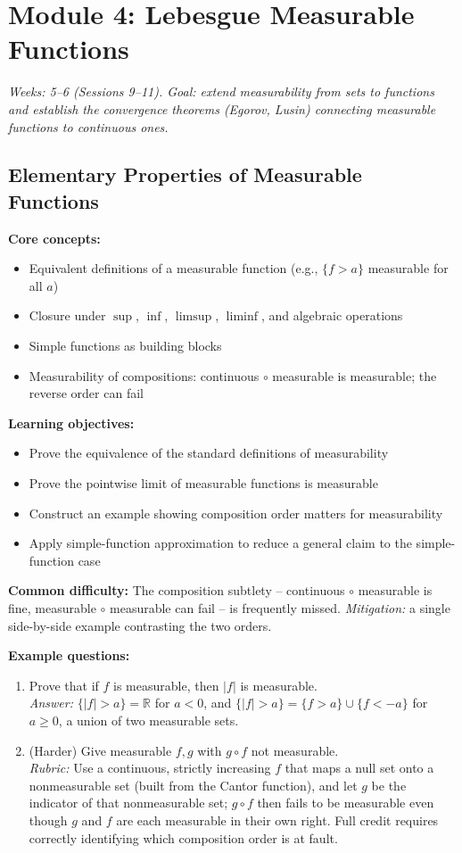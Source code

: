 \documentclass[11pt]{article}
\begin{document}
\section{Module 4: Lebesgue Measurable Functions}
\textit{Weeks: 5--6 (Sessions 9--11). Goal: extend measurability from sets to functions and establish the convergence theorems (Egorov, Lusin) connecting measurable functions to continuous ones.}

\subsection{Elementary Properties of Measurable Functions}

\textbf{Core concepts:}
\begin{itemize}[nosep]
\item Equivalent definitions of a measurable function (e.g., $\{f>a\}$ measurable for all $a$)
\item Closure under $\sup$, $\inf$, $\limsup$, $\liminf$, and algebraic operations
\item Simple functions as building blocks
\item Measurability of compositions: continuous$\,\circ\,$measurable is measurable; the reverse order can fail
\end{itemize}

\textbf{Learning objectives:}
\begin{itemize}[nosep]
\item Prove the equivalence of the standard definitions of measurability
\item Prove the pointwise limit of measurable functions is measurable
\item Construct an example showing composition order matters for measurability
\item Apply simple-function approximation to reduce a general claim to the simple-function case
\end{itemize}

\textbf{Common difficulty:} The composition subtlety -- continuous$\,\circ\,$measurable is fine, measurable$\,\circ\,$measurable can fail -- is frequently missed. \textit{Mitigation:} a single side-by-side example contrasting the two orders.

\textbf{Example questions:}
\begin{enumerate}[nosep]
\item Prove that if $f$ is measurable, then $|f|$ is measurable. \\
\textit{Answer:} $\{|f|>a\}=\mathbb{R}$ for $a<0$, and $\{|f|>a\}=\{f>a\}\cup\{f<-a\}$ for $a\ge0$, a union of two measurable sets.
\item (Harder) Give measurable $f,g$ with $g\circ f$ not measurable. \\
\textit{Rubric:} Use a continuous, strictly increasing $f$ that maps a null set onto a nonmeasurable set (built from the Cantor function), and let $g$ be the indicator of that nonmeasurable set; $g\circ f$ then fails to be measurable even though $g$ and $f$ are each measurable in their own right. Full credit requires correctly identifying which composition order is at fault.
\end{enumerate}
\end{document}
